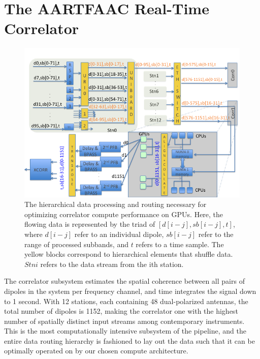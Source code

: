 \documentclass{ws-jai}
\begin{document}
\section {\label{sec:gpucorr} The AARTFAAC Real-Time Correlator}
\begin{figure}[htbp]
\centering
\includegraphics[width=1\textwidth]{Figs/data_routing_transform_hierarchy/Slide1.png}
\caption{The hierarchical  data processing and routing  necessary for optimizing
  correlator compute performance on GPUs.  Here, the flowing data is represented
  by the  triad of $[d[i-j],sb[i-j],t]$,  where $d[i-j]$ refer to  an individual
  dipole, $sb[i-j]$ refer to the range  of processed subbands, and $t$ refers to
  a time  sample.  The  yellow blocks correspond  to hierarchical  elements that
  shuffle data.$Stni$ refers to the data stream from the ith station.}
\label{fig:afaac_station_hw}
\end{figure}

The correlator  subsystem estimates the  spatial coherence between all  pairs of
dipoles in the system per frequency channel, and time integrates the signal down
to 1 second.  With 12 stations, each containing 48  dual-polarized antennas, the
total number  of dipoles  is 1152,  making the correlator  one with  the highest
number of spatially distinct input streams among contemporary instruments.  This
is the most computationally intensive subsystem  of the pipeline, and the entire
data routing  hierarchy is fashioned  to lay  out the data  such that it  can be
optimally operated on by our chosen compute architecture.
\end{document}
